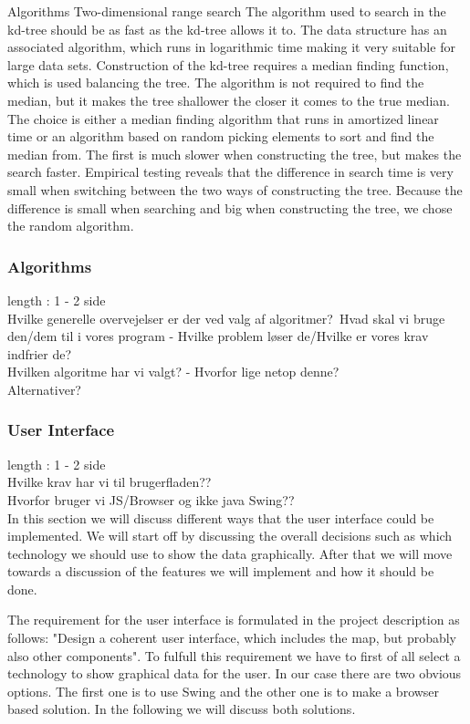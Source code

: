 \documentclass[a4paper,10pt,titlepage]{article}
\begin{document}
Algorithms
Two-dimensional range search
The algorithm used to search in the kd-tree should be as fast as the kd-tree allows it to. The data structure has an associated algorithm, which runs in logarithmic time making it very suitable for large data sets.
Construction of the kd-tree requires a median finding function, which is used balancing the tree. The algorithm is not required to find the median, but it makes the tree shallower the closer it comes to the true median. The choice is either a median finding algorithm that runs in amortized linear time or an algorithm based on random picking elements to sort and find the median from. The first is much slower when constructing the tree, but makes the search faster. Empirical testing reveals that the difference in search time is very small when switching between the two ways of constructing the tree. Because the difference is small when searching and big when constructing the tree, we chose the random algorithm.

				
			\subsubsection{Algorithms}
				length : 1 - 2 side\\
				Hvilke generelle overvejelser er der ved valg af algoritmer?\
				Hvad skal vi bruge den/dem til i vores program - Hvilke problem løser de/Hvilke er vores krav indfrier de?\\
				Hvilken algoritme har vi valgt? - Hvorfor lige netop denne?\\
				Alternativer?\\
								
			\subsubsection{User Interface}
				length : 1 - 2 side\\
				Hvilke krav har vi til brugerfladen??\\
				Hvorfor bruger vi JS/Browser og ikke java Swing??\\
				
				In this section we will discuss different ways that the user interface could be implemented. We will start off by discussing the overall decisions such as which technology we should use to show the data graphically. After that we will move towards a discussion of the features we will implement and how it should be done.  

The requirement for the user interface is formulated in the project description as follows: "Design a coherent user interface, which includes the map, but probably also other components". To fulfull this requirement we have to first of all select a technology to show graphical data for the user. In our case there are two obvious options. The first one is to use Swing and the other one is to make a browser based solution. In the following we will discuss both solutions.
\end{document}
